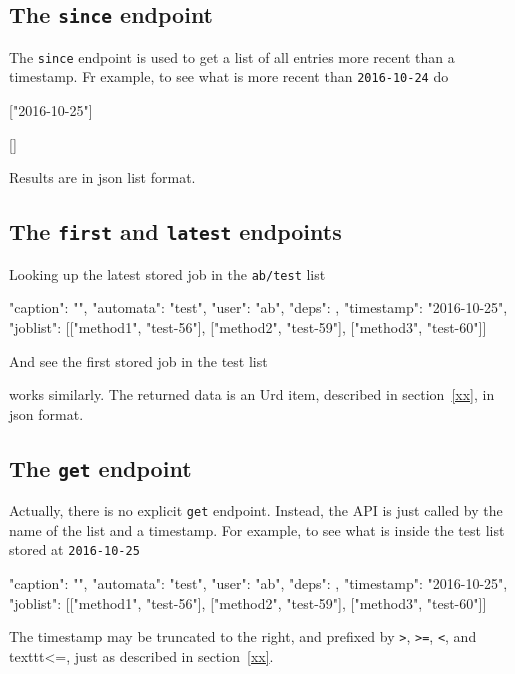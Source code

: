 \subsection{The \texttt{since} endpoint}
The \texttt{since} endpoint is used to get a list of all entries more recent than a timestamp.
Fr example, to see what is more recent than \texttt{2016-10-24} do
\begin{shell}
["2016-10-25"]
\end{shell}
\begin{shell}
[]
\end{shell}
Results are in json list format.


\subsection{The \texttt{first} and \texttt{latest} endpoints}
Looking up the latest stored job in the \texttt{ab/test} list
\begin{shell}
{"caption": "", "automata": "test", "user": "ab", "deps": {},
  "timestamp": "2016-10-25", "joblist": [["method1", "test-56"],
  ["method2", "test-59"], ["method3", "test-60"]]}
\end{shell}
And see the first stored job in the test list
\begin{shell}
\end{shell}
works similarly.  The returned data is an Urd item, described in
section~\ref{xx}, in json format.



\subsection{The \texttt{get} endpoint}
Actually, there is no explicit \texttt{get} endpoint.  Instead, the
API is just called by the name of the list and a timestamp.  For
example, to see what is inside the test list stored
at \texttt{2016-10-25}
\begin{shell}
{"caption": "", "automata": "test", "user": "ab", "deps": {},
  "timestamp": "2016-10-25", "joblist": [["method1", "test-56"],
  ["method2", "test-59"], ["method3", "test-60"]]}
\end{shell}
The timestamp may be truncated to the right, and prefixed
by \texttt{>}, \texttt{>=}, \texttt{<}, and texttt{<=}, just as
described in section~\ref{xx}.



